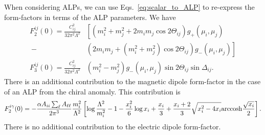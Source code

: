 {When considering ALPs, we can use  Eqs.~\ref{eq:scalar_to_ALP} to re-express the form-factors in terms of the ALP parameters. We have 
\begin{align}
    F_2^{ij}(0) = \frac{C_{ij}^2}{32\pi^2 \Lambda^2}&\left[(m_i^2 + m_j^2 + 2m_i m_j\cos{2\Theta}_{ij})g_+(\mu_i, \mu_j)\right.\nonumber\\
    \ -&\left.\left(2m_i m_j + (m_i^2+m_j^2)\cos{2\Theta_{ij}} \right)g_-(\mu_i,\mu_j)\right]\\
    F_3^{ij}(0) = \frac{C_{ij}^2}{32\pi^2 \Lambda^2}&\left(m_i^2 - m_j^2\right)g_-(\mu_i, \mu_j)\sin{2\Theta_{ij}}\sin{\Delta_{ij}}.
\end{align}
There is an additional contribution to the magnetic dipole form-factor in the case of an ALP from the chiral anomaly. This contribution is \cite{Cornella:2019uxs}
\begin{equation}
    F_2^{i\gamma}(0) = -\frac{\alpha A_{ii}\sum_\ell A_{\ell\ell}}{2\pi^3}\frac{m_i^2}{\Lambda^2}\left[\log\frac{\Lambda^2}{m_i^2} - 1-\frac{x_i^2}{6}\log{x_i}+\frac{x_i}{3}+\frac{x_i+2}{3}\sqrt{x_i^2 - 4x_i}{\rm arccosh}\frac{\sqrt{x_i}}{2}\right].
\end{equation}
There is no additional contribution to the electric dipole form-factor.
}
